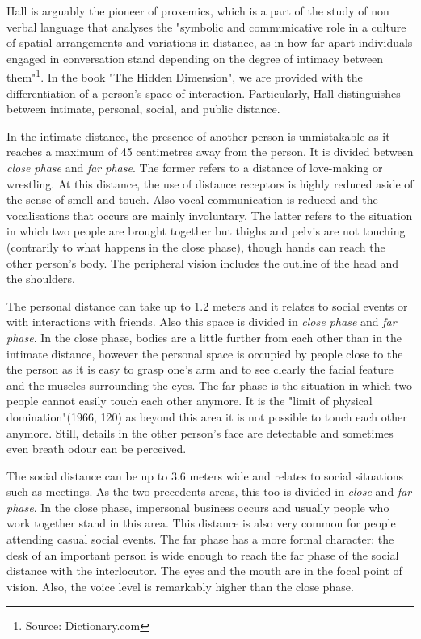 \documentclass[../main.tex]{subfiles}
\begin{document}
Hall is arguably the pioneer of proxemics, which is a part of the study of non verbal language that analyses the "symbolic and communicative role in a culture of spatial arrangements and variations in distance, as in how far apart individuals engaged in conversation stand depending on the degree of intimacy between them"\footnote{Source: Dictionary.com}. In the book "The Hidden Dimension"\cite{hall3}, we are provided with the differentiation of a person's space of interaction. Particularly, Hall distinguishes between intimate, personal, social, and public distance.

In the intimate distance, the presence of another person is unmistakable as it reaches a maximum of 45 centimetres away from the person. It is divided between \textit{close phase} and \textit{far phase}. The former refers to a distance of love-making or wrestling. At this distance, the use of distance receptors is highly reduced aside of the sense of smell and touch. Also vocal communication is reduced and  the vocalisations that occurs are mainly involuntary. The latter refers to the situation in which two people are brought together but thighs and pelvis are not touching (contrarily to what happens in the close phase), though hands can reach the other person's body. The peripheral vision includes the outline of the head and the shoulders.

The personal distance can take up to 1.2 meters and it relates to social events or with interactions with friends. Also this space is divided in \textit{close phase} and \textit{far phase}. In the close phase, bodies are a little further from each other than in the intimate distance, however the personal space is occupied by people close to the the person as it is easy to grasp one's arm and to see clearly the facial feature and the muscles surrounding the eyes. The far phase is the situation in which two people cannot easily touch each other anymore. It is the "limit of physical domination"(1966, 120) as beyond this area it is not possible to touch each other anymore. Still, details in the other person's face are detectable and sometimes even breath odour can be perceived.

The social distance can be up to 3.6 meters wide and relates to social situations such as meetings. As the two precedents areas, this too is divided in \textit{close} and \textit{far phase}. In the close phase, impersonal business occurs and usually people who work together stand in this area. This distance is also very common for people attending casual social events. The far phase has a more formal character: the desk of an important person is wide enough to reach the far phase of the social distance with the interlocutor. The eyes and the mouth are in the focal point of vision. Also, the voice level is remarkably higher than the close phase.
\end{document}
